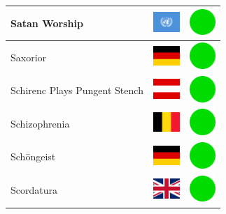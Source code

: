 \documentclass[12pt, a4paper, twoside]{report}
\begin{document}
\begin{center}
\begin{longtable}{|p{5cm}|p{2cm}|p{2cm}|}
 Satan Worship                                              & \includegraphics[width=1cm]{../4x3/un} &   \includegraphics[width=1cm]{../likes/y} \\ \hline
 Saxorior                                                   & \includegraphics[width=1cm]{../4x3/de} &   \includegraphics[width=1cm]{../likes/y} \\ \hline
 Schirenc Plays Pungent Stench                              & \includegraphics[width=1cm]{../4x3/at} &   \includegraphics[width=1cm]{../likes/y} \\ \hline
 Schizophrenia                                              & \includegraphics[width=1cm]{../4x3/be} &   \includegraphics[width=1cm]{../likes/y} \\ \hline
 Schöngeist                                                 & \includegraphics[width=1cm]{../4x3/de} &   \includegraphics[width=1cm]{../likes/y} \\ \hline
 Scordatura                                                 & \includegraphics[width=1cm]{../4x3/gb} &   \includegraphics[width=1cm]{../likes/y} \\ \hline

\end{longtable}
\end{center}
\end{document}
